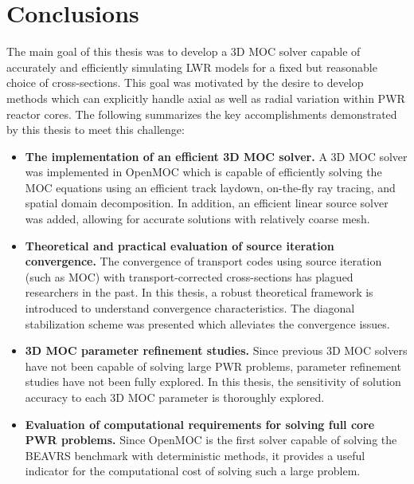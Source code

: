 \chapter{Conclusions}
\label{chap:conclusions}


The main goal of this thesis was to develop a 3D MOC solver capable of accurately and efficiently simulating LWR models for a fixed but reasonable choice of cross-sections. This goal was motivated by the desire to develop methods which can explicitly handle axial as well as radial variation within PWR reactor cores. The following summarizes the key accomplishments demonstrated by this thesis to meet this challenge:

\begin{itemize}
	
	\item \textbf{The implementation of an efficient 3D MOC solver.} A 3D MOC solver was implemented in OpenMOC which is capable of efficiently solving the MOC equations using an efficient track laydown, on-the-fly ray tracing, and spatial domain decomposition. In addition, an efficient linear source solver was added, allowing for accurate solutions with relatively coarse mesh.
	
	\item \textbf{Theoretical and practical evaluation of source iteration convergence.} The convergence of transport codes using source iteration (such as MOC) with transport-corrected cross-sections has plagued researchers in the past. In this thesis, a robust theoretical framework is introduced to understand convergence characteristics. The diagonal stabilization scheme was presented which alleviates the convergence issues.
	
	\item \textbf{3D MOC parameter refinement studies.} Since previous 3D MOC solvers have not been capable of solving large PWR problems, parameter refinement studies have not been fully explored. In this thesis, the sensitivity of solution accuracy to each 3D MOC parameter is thoroughly explored.
	
	\item \textbf{Evaluation of computational requirements for solving full core PWR problems.} Since OpenMOC is the first solver capable of solving the BEAVRS benchmark with deterministic methods, it provides a useful indicator for the computational cost of solving such a large problem.
	
\end{itemize}

